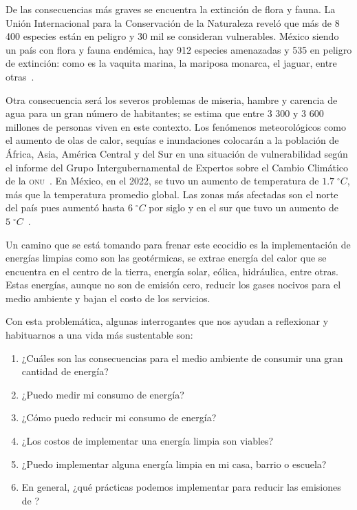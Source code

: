 \documentclass[article,11pt]{memoir}
\begin{document}
De las consecuencias más graves se encuentra la extinción de flora y fauna. La Unión Internacional para la Conservación de la Naturaleza reveló que más de 8 400 especies están en peligro y 30 mil se consideran vulnerables. México siendo un país con flora y fauna endémica, hay 912 especies amenazadas y 535 en peligro de extinción: como es la vaquita marina, la mariposa monarca, el jaguar, entre otras~\parencite{Especies}.

Otra consecuencia será los severos problemas de miseria, hambre y carencia de agua para un gran número de habitantes; se estima que entre 3 300 y 3 600 millones de personas viven en este contexto. Los fenómenos meteorológicos como el aumento de olas de calor, sequías e inundaciones colocarán a la población de África, Asia, América Central y del Sur en una situación de vulnerabilidad según el informe del Grupo Intergubernamental de Expertos sobre el Cambio Climático de la \textsc{onu}~\parencite{Informe}. En México, en el 2022, se tuvo un aumento de temperatura de \(1.7\;^\circ C\), más que la temperatura promedio global. Las zonas más afectadas son el norte del país pues aumentó hasta \(6\;^\circ C\) por siglo y en el sur que tuvo un aumento de \(5\;^\circ C\)~\parencite{Promedio}.

Un camino que se está tomando para frenar este ecocidio es la implementación de energías limpias como son las geotérmicas, se extrae energía del calor que se encuentra en el centro de la tierra, energía solar, eólica, hidráulica, entre otras. Estas energías, aunque no son de emisión cero, reducir los gases nocivos para el medio ambiente y bajan el costo de los servicios.

Con esta problemática, algunas interrogantes que nos ayudan a reflexionar y habituarnos a una vida más sustentable son:
\begin{enumerate}
  \item ¿Cuáles son las consecuencias para el medio ambiente de consumir una gran cantidad de energía?
  \item ¿Puedo medir mi consumo de energía?
  \item ¿Cómo puedo reducir mi consumo de energía?
  \item ¿Los costos de implementar una energía limpia son viables?
  \item ¿Puedo implementar alguna energía limpia en mi casa, barrio o escuela?
  \item En general, ¿qué prácticas podemos implementar para reducir las emisiones de ?
\end{enumerate}
\end{document}
